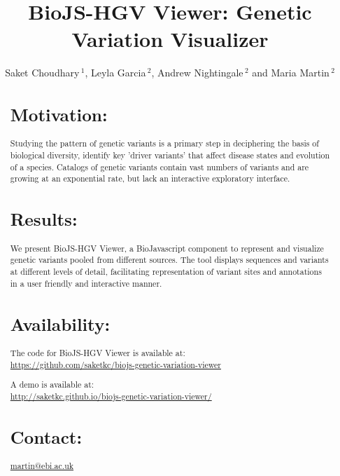 \documentclass{bioinfo}
\begin{document}

\title[short Title]{BioJS-HGV Viewer: Genetic Variation Visualizer}
\author[Choudhary \textit{et~al}]{Saket Choudhary\,$^{1}$, Leyla Garcia\,$^{2}$, Andrew Nightingale\,$^{2}$ and Maria Martin\,$^2$}
\address{$^{1}$Molecular and Computational Biology, University of Southern California, Los Angeles, California, 90007, USA \\
$^{2}$European Bioinformatics Institute EMBL-EBI, Hinxton, Cambridge, CB10 1SD, UK}



\maketitle

\begin{abstract}

\section{Motivation:}
Studying the pattern of genetic variants is a primary step in deciphering the basis of biological diversity, identify key 'driver variants' that affect disease states and evolution of a species. Catalogs of genetic variants contain vast numbers of variants and are growing at an exponential rate, but lack an interactive exploratory interface.




\section{Results:}
We present BioJS-HGV Viewer, a BioJavascript component to represent and visualize genetic variants pooled from different sources. The tool displays sequences and variants at different levels of detail, facilitating representation of variant sites and annotations in a user friendly and interactive manner. 


\section{Availability:}
The code for BioJS-HGV Viewer is available at:\\ \href{https://github.com/saketkc/biojs-genetic-variation-viewer}{https://github.com/saketkc/biojs-genetic-variation-viewer}

A demo is available at:\\ \footnotesize{\href{http://saketkc.github.io/biojs-genetic-variation-viewer/}{http://saketkc.github.io/biojs-genetic-variation-viewer/}}

\section{Contact:} \href{martin@ebi.ac.uk}{martin@ebi.ac.uk}
\end{abstract}
\end{document}
